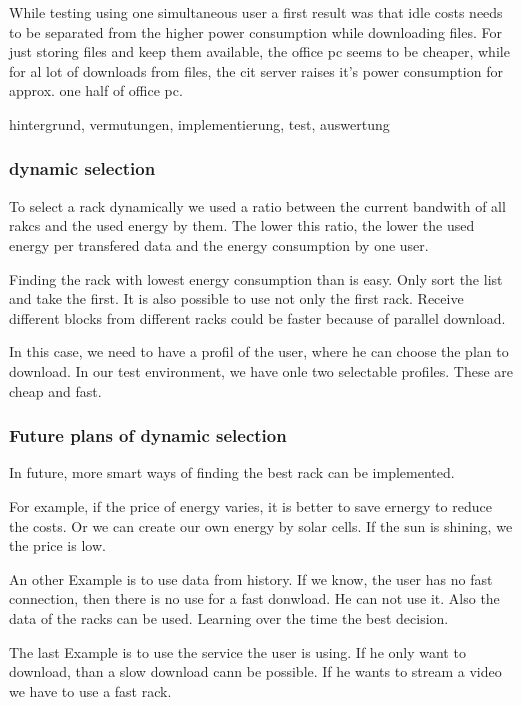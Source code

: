 While testing using one simultaneous user a first result was that idle costs needs to be separated from the higher power consumption while downloading files. For just storing files and keep them available, the office pc seems to be cheaper, while for al lot of downloads from files, the cit server raises it's power consumption for approx. one half of office pc.



hintergrund, vermutungen, implementierung, test, auswertung

\subsubsection{dynamic selection}

To select a rack dynamically we used a ratio between the current bandwith of all rakcs and the used energy by them. The lower this ratio, the lower the used energy per transfered data and the energy consumption by one user.

Finding the rack with lowest energy consumption than is easy. Only sort the list and take the first. It is also possible to use not only the first rack. Receive different blocks from different racks could be faster because of parallel download.

In this case, we need to have a profil of the user, where he can choose the plan to download. In our test environment, we have onle two selectable profiles. These are cheap and fast.

\subsubsection{Future plans of dynamic selection}

In future, more smart ways of finding the best rack can be implemented. 

For example, if the price of energy varies, it is better to save ernergy to reduce the costs. Or we can create our own energy by solar cells. If the sun is shining, we the price is low.

An other Example is to use data from history. If we know, the user has no fast connection, then there is no use for a fast donwload. He can not use it. Also the data of the racks can be used. Learning over the time the best decision.

The last Example is to use the service the user is using. If he only want to download, than a slow download cann be possible. If he wants to stream a video we have to use a fast rack.


